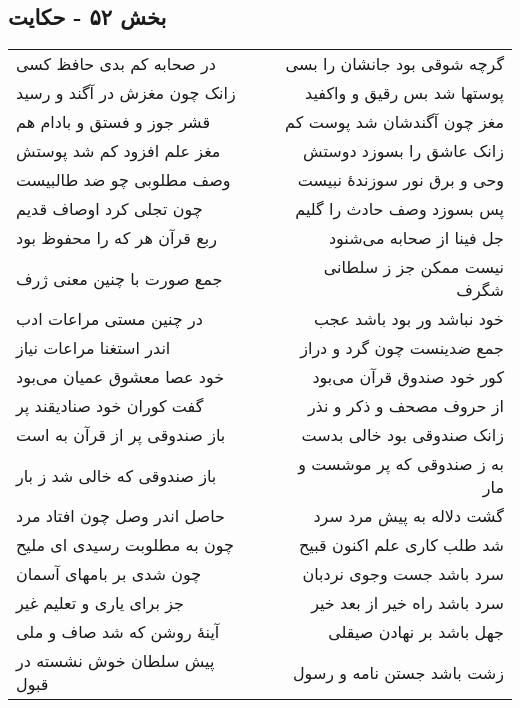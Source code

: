 \begin{center}
\section*{بخش ۵۲ - حکایت}
\label{sec:sh052}
\begin{longtable}{l p{0.5cm} r}
در صحابه کم بدی حافظ کسی
&&
گرچه شوقی بود جانشان را بسی
\\
زانک چون مغزش در آگند و رسید
&&
پوستها شد بس رقیق و واکفید
\\
قشر جوز و فستق و بادام هم
&&
مغز چون آگندشان شد پوست کم
\\
مغز علم افزود کم شد پوستش
&&
زانک عاشق را بسوزد دوستش
\\
وصف مطلوبی چو ضد طالبیست
&&
وحی و برق نور سوزندهٔ نبیست
\\
چون تجلی کرد اوصاف قدیم
&&
پس بسوزد وصف حادث را گلیم
\\
ربع قرآن هر که را محفوظ بود
&&
جل فینا از صحابه می‌شنود
\\
جمع صورت با چنین معنی ژرف
&&
نیست ممکن جز ز سلطانی شگرف
\\
در چنین مستی مراعات ادب
&&
خود نباشد ور بود باشد عجب
\\
اندر استغنا مراعات نیاز
&&
جمع ضدینست چون گرد و دراز
\\
خود عصا معشوق عمیان می‌بود
&&
کور خود صندوق قرآن می‌بود
\\
گفت کوران خود صنادیقند پر
&&
از حروف مصحف و ذکر و نذر
\\
باز صندوقی پر از قرآن به است
&&
زانک صندوقی بود خالی بدست
\\
باز صندوقی که خالی شد ز بار
&&
به ز صندوقی که پر موشست و مار
\\
حاصل اندر وصل چون افتاد مرد
&&
گشت دلاله به پیش مرد سرد
\\
چون به مطلوبت رسیدی ای ملیح
&&
شد طلب کاری علم اکنون قبیح
\\
چون شدی بر بامهای آسمان
&&
سرد باشد جست وجوی نردبان
\\
جز برای یاری و تعلیم غیر
&&
سرد باشد راه خیر از بعد خیر
\\
آینهٔ روشن که شد صاف و ملی
&&
جهل باشد بر نهادن صیقلی
\\
پیش سلطان خوش نشسته در قبول
&&
زشت باشد جستن نامه و رسول
\\
\end{longtable}
\end{center}
